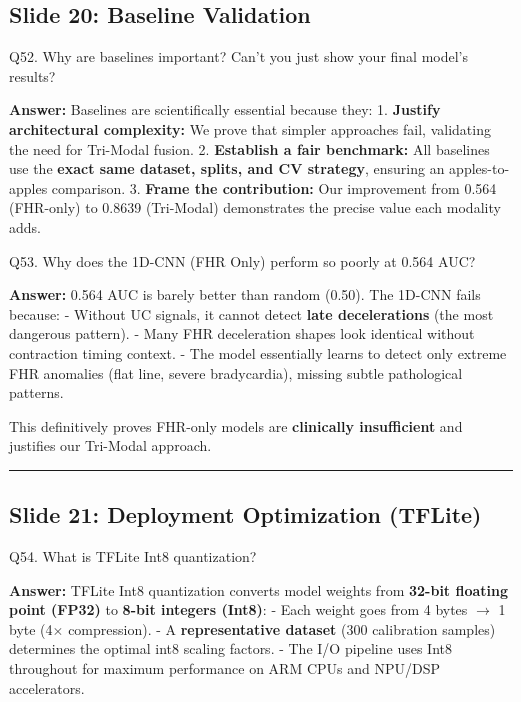 \documentclass[11pt,a4paper]{article}
\begin{document}
\subsection{Slide 20: Baseline
Validation}\label{slide-20-baseline-validation}

\begin{questionbox}
Q52. Why are baselines important? Can't you just show your final
model's results?
\end{questionbox}
\textbf{Answer:} Baselines are scientifically essential because they: 1.
\textbf{Justify architectural complexity:} We prove that simpler
approaches fail, validating the need for Tri-Modal fusion. 2.
\textbf{Establish a fair benchmark:} All baselines use the \textbf{exact
same dataset, splits, and CV strategy}, ensuring an apples-to-apples
comparison. 3. \textbf{Frame the contribution:} Our improvement from
0.564 (FHR-only) to 0.8639 (Tri-Modal) demonstrates the precise value
each modality adds.

\begin{questionbox}
Q53. Why does the 1D-CNN (FHR Only) perform so poorly at 0.564
AUC?
\end{questionbox}
\textbf{Answer:} 0.564 AUC is barely better than random (0.50). The 1D-CNN
fails because: - Without UC signals, it cannot detect \textbf{late
decelerations} (the most dangerous pattern). - Many FHR deceleration
shapes look identical without contraction timing context. - The model
essentially learns to detect only extreme FHR anomalies (flat line,
severe bradycardia), missing subtle pathological patterns.

This definitively proves FHR-only models are \textbf{clinically
insufficient} and justifies our Tri-Modal approach.

\begin{center}\rule{0.5\linewidth}{0.5pt}\end{center}

\subsection{Slide 21: Deployment Optimization
(TFLite)}\label{slide-21-deployment-optimization-tflite}

\begin{questionbox}
Q54. What is TFLite Int8 quantization?
\end{questionbox}
\textbf{Answer:} TFLite Int8 quantization converts model weights from
\textbf{32-bit floating point (FP32)} to \textbf{8-bit integers (Int8)}:
- Each weight goes from 4 bytes $\rightarrow$ 1 byte (4$\times$ compression). - A
\textbf{representative dataset} (300 calibration samples) determines the
optimal int8 scaling factors. - The I/O pipeline uses Int8 throughout
for maximum performance on ARM CPUs and NPU/DSP accelerators.
\end{document}
